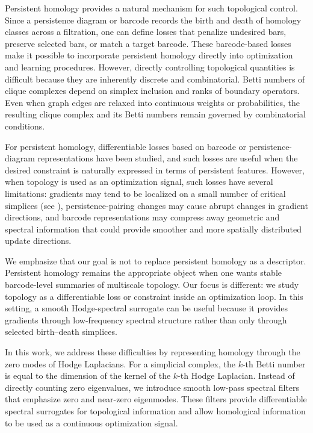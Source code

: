 \documentclass[pdflatex,sn-mathphys-ay]{sn-jnl}%
\theoremstyle{thmstyleone}%
\theoremstyle{thmstyletwo}%
\theoremstyle{thmstylethree}%
\begin{document}
Persistent homology provides a natural mechanism for such topological control. Since a persistence diagram or barcode records the birth and death of homology classes across a filtration, one can define losses that penalize undesired bars, preserve selected bars, or match a target barcode. These barcode-based losses make it possible to incorporate persistent homology directly into optimization and learning procedures.
However, directly controlling topological quantities is difficult because they are inherently discrete and combinatorial. Betti numbers of clique complexes depend on simplex inclusion and ranks of boundary operators. Even when graph edges are relaxed into continuous weights or probabilities, the resulting clique complex and its Betti numbers remain governed by combinatorial conditions.

For persistent homology, differentiable losses based on barcode or persistence-diagram representations have been studied, and such losses are useful when the desired constraint is naturally expressed in terms of persistent features. However, when topology is used as an optimization signal, such losses have several limitations: gradients may tend to be localized on a small number of critical simplices (see \cite{nigmetov2024topological,nigmetov2024topological_2}), persistence-pairing changes may cause abrupt changes in gradient directions, and barcode representations may compress away geometric and spectral information that could provide smoother and more spatially distributed update directions. 

We emphasize that our goal is not to replace persistent homology as a descriptor. Persistent homology remains the appropriate object when one wants stable barcode-level summaries of multiscale topology. Our focus is different: we study topology as a differentiable loss or constraint inside an optimization loop. In this setting, a smooth Hodge-spectral surrogate can be useful because it provides gradients through low-frequency spectral structure rather than only through selected birth--death simplices.

In this work, we address these difficulties by representing homology through the zero modes of Hodge Laplacians. For a simplicial complex, the \(k\)-th Betti number is equal to the dimension of the kernel of the \(k\)-th Hodge Laplacian. Instead of directly counting zero eigenvalues, we introduce smooth low-pass spectral filters that emphasize zero and near-zero eigenmodes.
These filters provide differentiable spectral surrogates for topological information and allow homological information to be used as a continuous optimization signal.
\end{document}
